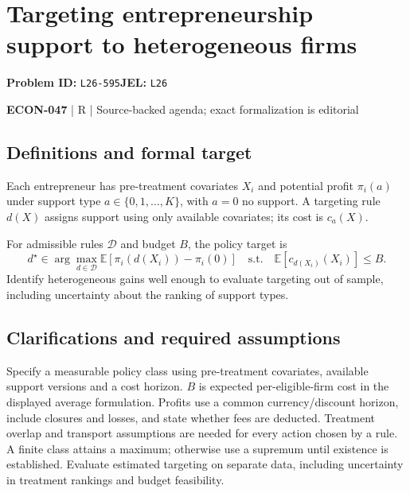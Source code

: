 \documentclass[11pt,a4paper]{article}
\begin{document}
\section*{Targeting entrepreneurship support to heterogeneous firms}
\textbf{Problem ID:} \texttt{L26-595}\quad \textbf{JEL:} \texttt{L26}\par
\label{problem:OP-0617}


\label{audited:ECON-047}

{\sffamily\small\color{muted}\textbf{ECON-047} | R | Source-backed agenda; exact formalization is editorial\par}

\subsection*{Definitions and formal target}

Each entrepreneur has pre-treatment covariates $X_i$ and potential profit $\pi_i(a)$ under support type $a\in\{0,1,\ldots,K\}$, with $a=0$ no support. A targeting rule $d(X)$ assigns support using only available covariates; its cost is $c_a(X)$.

For admissible rules $\mathcal D$ and budget $B$, the policy target is
\[
 d^\star\in\arg\max_{d\in\mathcal D}
 \mathbb E[\pi_i(d(X_i))-\pi_i(0)]
 \quad\text{s.t.}\quad \mathbb E[c_{d(X_i)}(X_i)]\leq B.
\]
Identify heterogeneous gains well enough to evaluate targeting out of sample, including uncertainty about the ranking of support types.

\subsection*{Clarifications and required assumptions}

Specify a measurable policy class using pre-treatment covariates, available support versions and a cost horizon. \(B\) is expected per-eligible-firm cost in the displayed average formulation. Profits use a common currency/discount horizon, include closures and losses, and state whether fees are deducted. Treatment overlap and transport assumptions are needed for every action chosen by a rule. A finite class attains a maximum; otherwise use a supremum until existence is established. Evaluate estimated targeting on separate data, including uncertainty in treatment rankings and budget feasibility.
\end{document}
